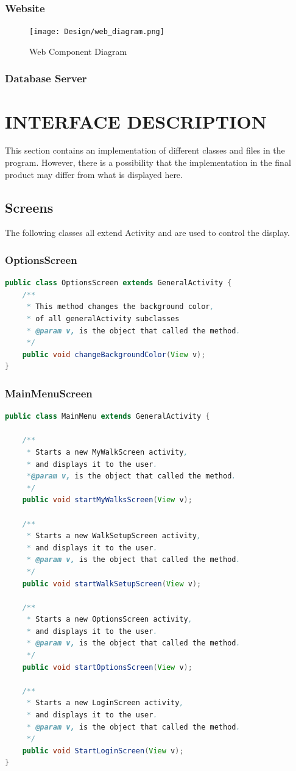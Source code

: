 \documentclass[12pt]{article}
\begin{document}
\subsubsection{Website}
\clearpage
\begin{figure}[htp]
\centering
\texttt{[image: Design/web\_diagram.png]}
\caption{Web Component Diagram}
\label{Web Component Diagram}
\end{figure}
\subsubsection{Database Server}
\section{INTERFACE DESCRIPTION}
This section contains an implementation of different classes and files in the program. However, there is a possibility that the implementation in the final product may differ from what is displayed here.
\subsection{Screens}
The following classes all extend Activity and are used to control the display.
\subsubsection{OptionsScreen}
\begin{lstlisting}[language=java]
public class OptionsScreen extends GeneralActivity {
	/**
	 * This method changes the background color,
	 * of all generalActivity subclasses
	 * @param v, is the object that called the method.
	 */
	public void changeBackgroundColor(View v);
}
\end{lstlisting}
\subsubsection{MainMenuScreen}
\begin{lstlisting}[language=java]
public class MainMenu extends GeneralActivity {

	/**
	 * Starts a new MyWalkScreen activity,
	 * and displays it to the user.
	 *@param v, is the object that called the method.
	 */
	public void startMyWalksScreen(View v);

	/**
	 * Starts a new WalkSetupScreen activity,
	 * and displays it to the user.
	 * @param v, is the object that called the method.
	 */
	public void startWalkSetupScreen(View v);
	
	/**
	 * Starts a new OptionsScreen activity,
	 * and displays it to the user.
	 * @param v, is the object that called the method.
	 */
	public void startOptionsScreen(View v);

	/**
	 * Starts a new LoginScreen activity,
	 * and displays it to the user.
	 * @param v, is the object that called the method.
	 */
	public void StartLoginScreen(View v);
}
\end{lstlisting}
\end{document}
